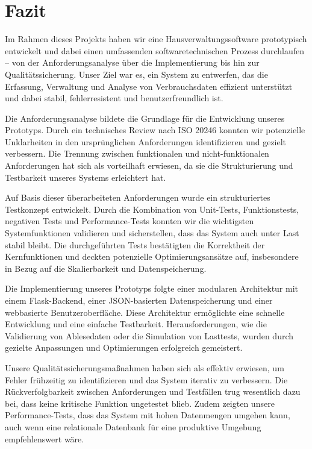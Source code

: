 \section{Fazit}\label{Fazit}


Im Rahmen dieses Projekts haben wir eine Hausverwaltungssoftware prototypisch entwickelt und dabei einen umfassenden softwaretechnischen Prozess durchlaufen – von der Anforderungsanalyse über die Implementierung bis hin zur Qualitätssicherung.
Unser Ziel war es, ein System zu entwerfen, das die Erfassung, Verwaltung und Analyse von Verbrauchsdaten effizient unterstützt und dabei stabil, fehlerresistent und benutzerfreundlich ist.

Die Anforderungsanalyse bildete die Grundlage für die Entwicklung unseres Prototyps.
Durch ein technisches Review nach ISO 20246 konnten wir potenzielle Unklarheiten in den ursprünglichen Anforderungen identifizieren und gezielt verbessern.
Die Trennung zwischen funktionalen und nicht-funktionalen Anforderungen hat sich als vorteilhaft erwiesen, da sie die Strukturierung und Testbarkeit unseres Systems erleichtert hat.

Auf Basis dieser überarbeiteten Anforderungen wurde ein strukturiertes Testkonzept entwickelt.
Durch die Kombination von Unit-Tests, Funktionstests, negativen Tests und Performance-Tests konnten wir die wichtigsten Systemfunktionen validieren und sicherstellen, dass das System auch unter Last stabil bleibt.
Die durchgeführten Tests bestätigten die Korrektheit der Kernfunktionen und deckten potenzielle Optimierungsansätze auf, insbesondere in Bezug auf die Skalierbarkeit und Datenspeicherung.

Die Implementierung unseres Prototyps folgte einer modularen Architektur mit einem Flask-Backend, einer JSON-basierten Datenspeicherung und einer webbasierte Benutzeroberfläche.
Diese Architektur ermöglichte eine schnelle Entwicklung und eine einfache Testbarkeit. Herausforderungen, wie die Validierung von Ablesedaten oder die Simulation von Lasttests, wurden durch gezielte Anpassungen und Optimierungen erfolgreich gemeistert.

Unsere Qualitätssicherungsmaßnahmen haben sich als effektiv erwiesen, um Fehler frühzeitig zu identifizieren und das System iterativ zu verbessern. 
Die Rückverfolgbarkeit zwischen Anforderungen und Testfällen trug wesentlich dazu bei, dass keine kritische Funktion ungetestet blieb.
Zudem zeigten unsere Performance-Tests, dass das System mit hohen Datenmengen umgehen kann, auch wenn eine relationale Datenbank für eine produktive Umgebung empfehlenswert wäre.

